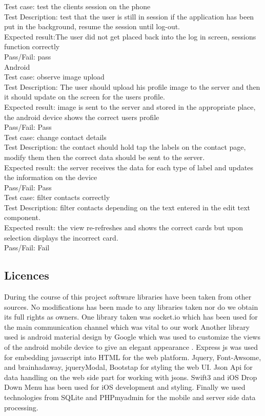 \documentclass{article}
\begin{document}
\begin{enumerate}
	Test case: test the clients session on the phone\\
	Test Description: test that the user is still in session if the application has been put in the background, resume the session until log-out.\\
	Expected result:The user did not get placed back into the log in screen, sessions function correctly\\
	Pass/Fail: pass\\
	
	Android\\
	Test case: observe image upload\\
	Test Description: The user should upload his profile image to the server and then it should update on the screen for the users profile.\\
	Expected result: image is sent to the server and stored in the appropriate place, the android device shows the correct users profile\\
	Pass/Fail: Pass\\
	
	Test case: change contact details\\
	Test Description: the contact should hold tap the labels on the contact page, modify them then the correct data should be sent to the server.\\
	Expected result: the server receives the data for each type of label and updates the information on the device\\
	Pass/Fail: Pass\\
	
	Test case: filter contacts correctly\\
	Test Description: filter contacts depending on the text entered in the edit text component.\\
	Expected result: the view re-refreshes and shows the correct cards but upon selection displays the incorrect card.\\
	Pass/Fail: Fail\\
	

	
	\subsection{Licences}
	During the course of this project software libraries have been taken from other sources. No modifications has been made to any libraries taken nor do we obtain its full rights as owners. One library taken was socket.io which has been used for the main communication channel which was vital to our work Another library used is android material design by Google which was used to customize the views of the android mobile device to give an elegant appearance . Express js was used for embedding javascript into HTML for the web platform. Jquery, Font-Awsome, and brainhadaway, jqueryModal, Bootstap for styling the web UI. Json Api for data handling on the web side part for working with jsons. Swift3 and  iOS Drop Down Menu has been used for iOS development and styling. Finally we used technologies from SQLite and PHPmyadmin for the mobile and server side data processing.
	
\end{enumerate}	
\end{document}
